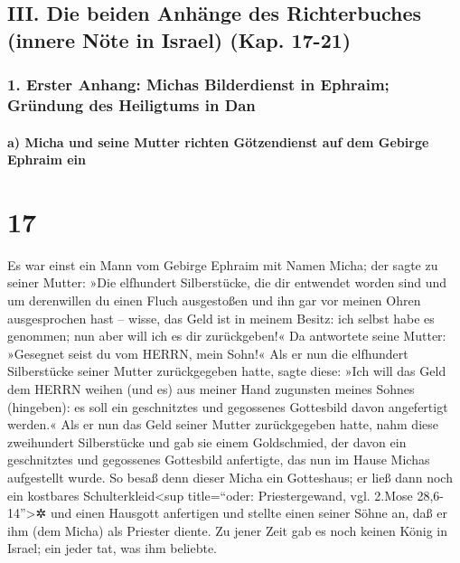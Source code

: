 \hypertarget{iii.-die-beiden-anhuxe4nge-des-richterbuches-innere-nuxf6te-in-israel-kap.-17-21}{%
\subsection{III. Die beiden Anhänge des Richterbuches (innere Nöte in
Israel) (Kap.
17-21)}\label{iii.-die-beiden-anhuxe4nge-des-richterbuches-innere-nuxf6te-in-israel-kap.-17-21}}

\hypertarget{erster-anhang-michas-bilderdienst-in-ephraim-gruxfcndung-des-heiligtums-in-dan}{%
\subsubsection{1. Erster Anhang: Michas Bilderdienst in Ephraim;
Gründung des Heiligtums in
Dan}\label{erster-anhang-michas-bilderdienst-in-ephraim-gruxfcndung-des-heiligtums-in-dan}}

\hypertarget{a-micha-und-seine-mutter-richten-guxf6tzendienst-auf-dem-gebirge-ephraim-ein}{%
\paragraph{a) Micha und seine Mutter richten Götzendienst auf dem
Gebirge Ephraim
ein}\label{a-micha-und-seine-mutter-richten-guxf6tzendienst-auf-dem-gebirge-ephraim-ein}}

\hypertarget{section-16}{%
\section{17}\label{section-16}}

Es war einst ein Mann vom Gebirge Ephraim mit Namen Micha;
der sagte zu seiner Mutter: »Die elfhundert Silberstücke,
die dir entwendet worden sind und um derenwillen du einen Fluch
ausgestoßen und ihn gar vor meinen Ohren ausgesprochen hast -- wisse,
das Geld ist in meinem Besitz: ich selbst habe es genommen; nun aber
will ich es dir zurückgeben!« Da antwortete seine Mutter: »Gesegnet
seist du vom HERRN, mein Sohn!« Als er nun die elfhundert
Silberstücke seiner Mutter zurückgegeben hatte, sagte diese: »Ich will
das Geld dem HERRN weihen (und es) aus meiner Hand zugunsten meines
Sohnes (hingeben): es soll ein geschnitztes und gegossenes Gottesbild
davon angefertigt werden.« Als er nun das Geld seiner
Mutter zurückgegeben hatte, nahm diese zweihundert Silberstücke und gab
sie einem Goldschmied, der davon ein geschnitztes und gegossenes
Gottesbild anfertigte, das nun im Hause Michas aufgestellt wurde.
So besaß denn dieser Micha ein Gotteshaus; er ließ dann
noch ein kostbares Schulterkleid\textless sup title=``oder:
Priestergewand, vgl. 2.Mose 28,6-14''\textgreater✲ und einen Hausgott
anfertigen und stellte einen seiner Söhne an, daß er ihm (dem Micha) als
Priester diente. Zu jener Zeit gab es noch keinen König in
Israel; ein jeder tat, was ihm beliebte.

